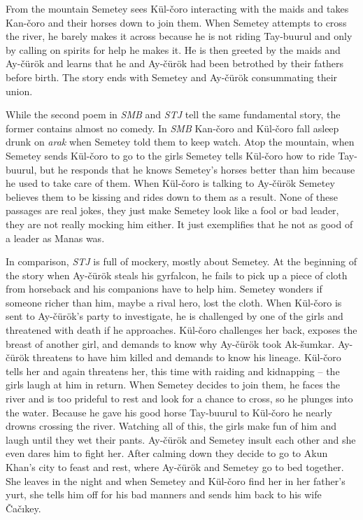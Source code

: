 \documentclass[12pt,a4paper]{article}
\newcommand{\Se} {Semetey}
\newcommand{\Ma} {Manas}
\newcommand{\Ac} {Ay-čürök}
\newcommand{\Ca} {Čačıkey}
\newcommand{\As} {Ak-šumkar}
\newcommand{\Ak} {Akun Khan}
\newcommand{\Tb} {Tay-buurul}
\newcommand{\Mbs}{\emph{SMB}}
\newcommand{\Tjs}{\emph{STJ}}
\newcommand{\Kuc}{Kül-čoro}
\newcommand{\Kac}{Kan-čoro}
\begin{document}
From the mountain \Se{} sees \Kuc{} interacting with the maids and takes \Kac{}
and their horses down to join them. When \Se{} attempts to cross the river, he
barely makes it across because he is not riding \Tb{} and only by calling on
spirits for help he makes it. He is then greeted by the maids and \Ac{} and
learns that he and \Ac{} had been betrothed by their fathers before
birth. The story ends with \Se{} and \Ac{} consummating their union.

While the second poem in \Mbs{} and \Tjs{} tell the same fundamental story, 
the former contains almost no
comedy. In \Mbs{} \Kac{} and \Kuc{} fall asleep drunk on \emph{arak} 
when \Se{} told them to keep watch. Atop the mountain, when \Se{} sends \Kuc{}
to go to the girls \Se{} tells \Kuc{} how to ride \Tb{}, but he responds that 
he knows \Se{}'s horses better than him because he used to take care of them.
When \Kuc{} is talking to \Ac{} \Se{} believes them to be kissing and rides
down to them as a result. None of these passages are real jokes, they just make
\Se{} look like a fool or bad leader, they are not really mocking him either.
It just exemplifies that he not as good of a leader as \Ma{} was.

In comparison, \Tjs{} is full of mockery, mostly about \Se{}. At the beginning
of the story when \Ac{} steals his gyrfalcon, he fails to pick up a piece of cloth from 
horseback and his companions have to help him. \Se{} wonders if someone richer
than him, maybe a rival hero, lost the cloth. When \Kuc{} is sent to \Ac{}'s
party to investigate, he
is challenged by one of the girls and threatened with death if he approaches.
\Kuc{} challenges her back, exposes the breast of another girl, and demands to
know why \Ac{} took \As{}. \Ac{} threatens to have him killed and demands to 
know his lineage. \Kuc{} tells her and again threatens her, this time with
raiding and kidnapping -- the girls laugh at him in return. 
When \Se{} decides to join them, he faces the river and is too
prideful to rest and look for a chance to cross, so he plunges into the water.
Because he gave his good horse \Tb{} to \Kuc{} he nearly drowns crossing
the river. Watching all of this, the girls make fun of him and
laugh until they wet their pants. \Ac{} and \Se{} insult each other and she
even dares him to fight her. After calming down they decide to go to \Ak{}'s city to
feast and rest, where \Ac{} and \Se{} go to bed together. She leaves in the
night and when \Se{} and \Kuc{} find her in her father's yurt, she tells him
off for his bad manners and sends him back to his wife \Ca{}.
\end{document}
